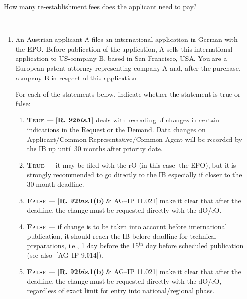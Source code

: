 \documentclass{report}
\newcommand{\p}{\adforn{61} \ }
\begin{document}
\begin{enumerate}[label=\textbf{Question \arabic*}]
\begin{enumerate}[label=\textbf{Question \arabic*}]
    \vspace{1em}
    How many re-establishment fees does the applicant need to pay? 

\end{enumerate}
\end{enumerate}




\begin{center}

\p \p \p
 
\end{center}

\begin{enumerate}[label=\textbf{Answer \arabic*}]

    \item %
   An Austrian applicant A files an international application in German with the EPO. Before publication of the application, A sells this international application to US-company B, based in San Francisco, USA.
You are a European patent attorney representing company A and, after the purchase, company B in respect of this application.


For each of the statements below, indicate whether the statement is true or false:

    \begin{enumerate}[label=(\alph*)]
        \item  \textbf{\textsc{True}} --- [\textbf{R. 92\textit{bis}.1}] deals with recording of changes in certain indications
in the Request or the Demand. Data changes on Applicant/Common Representative/Common Agent will be recorded by the IB up until 30 months after priority date. 
\item  \textbf{\textsc{True}} --- it may be filed with the rO (in this case, the EPO), but it is strongly recommended to go directly to the IB especially if closer to the 30-month deadline. 
\item  \textbf{\textsc{False}} --- [\textbf{R. 92\textit{bis}.1(b)} \& \textsc{AG--IP 11.021}] make it clear that after the deadline, the change must be requested directly with the dO/eO. 
\item \textbf{\textsc{False}} --- if change is to be taken into account before international publication, it should reach the IB before deadline for technical preparations, i.e., 1 day before the 15$^{\mathrm{th}}$ day before scheduled publication (see also: [\textsc{AG--IP 9.014}]).
\item \textbf{\textsc{False}} --- [\textbf{R. 92\textit{bis}.1(b)} \& \textsc{AG--IP 11.021}] make it clear that after the deadline, the change must be requested directly with the dO/eO, regardless of exact limit for entry into national/regional phase. 
    \end{enumerate}




\end{enumerate}
\end{document}
